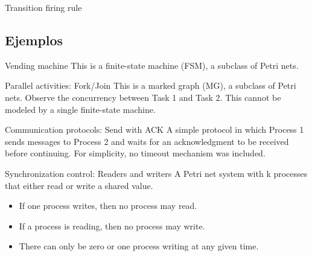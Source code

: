 \documentclass{beamer}
\begin{document}
\begin{frame}{Transition firing rule}
  \begin{figure}[!htb]
    \centering
    
  \end{figure}
\end{frame}

\subsection{Ejemplos}

\begin{frame}{Vending machine}
  \scriptsize
  This is a finite-state machine (FSM), a subclass of Petri nets.

  \begin{figure}
    \centering
    
  \end{figure}
\end{frame}

\begin{frame}{Parallel activities: Fork/Join}
  \scriptsize
  This is a marked graph (MG), a subclass of Petri nets.
  Observe the concurrency between Task 1 and Task 2.
  This cannot be modeled by a single finite-state machine.

  \begin{figure}
    \centering
    
  \end{figure}
\end{frame}

\begin{frame}{Communication protocols: Send with ACK}
  \scriptsize
  A simple protocol in which Process 1 sends messages to Process 2 and
  waits for an acknowledgment to be received before continuing.
  For simplicity, no timeout mechanism was included.

  \begin{figure}
    \centering
    
  \end{figure}
\end{frame}

\begin{frame}{Synchronization control: Readers and writers}
  \scriptsize
  A Petri net system with k processes that either read or write a shared value.

  \begin{itemize}
    \item If one process writes, then no process may read.
    \item If a process is reading, then no process may write.
    \item There can only be zero or one process writing at any given time.
  \end{itemize}

  \begin{figure}
    \centering
    
  \end{figure}
\end{frame}
\end{document}
